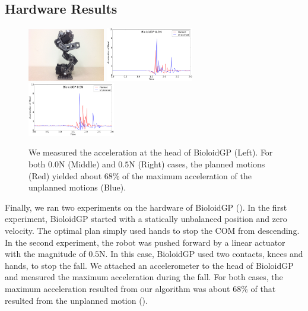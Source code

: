 \subsection{Hardware Results}

\begin{figure}[ht]
\center
  \includegraphics[width=0.3\textwidth]{images/hardware.jpg}
  \includegraphics[width=0.34\textwidth]{images/accel00.png}
  \includegraphics[width=0.34\textwidth]{images/accel01.png}
  \caption{We measured the acceleration at the head of BioloidGP (Left). 
    For both $0.0$N (Middle) and $0.5$N (Right) cases, the planned motions
      (Red) yielded about 68\% of the maximum acceleration of the unplanned
      motions (Blue).}
  \label{fig:falling_hardware}
\end{figure}

Finally, we ran two experiments on the hardware of BioloidGP
(). In the first experiment, BioloidGP started with
a statically unbalanced position and zero velocity. The optimal plan
simply used hands to stop the COM from descending. In the second
experiment, the robot was pushed forward by a
linear actuator with the magnitude of $0.5$N. In this case,
BioloidGP used two contacts, knees and hands, to stop the fall. We
attached an accelerometer to the head of BioloidGP and measured the
maximum acceleration during the fall. For both cases, the maximum
acceleration resulted from our algorithm was about
68\% of that resulted from the unplanned motion ().

